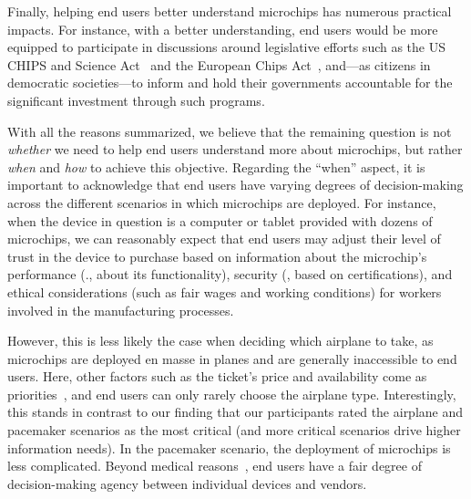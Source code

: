Finally, helping end users better understand microchips has numerous practical impacts. 
For instance, with a better understanding, end users would be more equipped to participate in discussions around legislative efforts such as the US CHIPS and Science Act~\cite{uschips2022} and the European Chips Act~\cite{euchips2022}, and---as citizens in democratic societies---to inform and hold their governments accountable for the significant investment through such programs. 



With all the reasons summarized, we believe that the remaining question is not \textit{whether} we need to help end users understand more about microchips, but rather \textit{when} and \textit{how} to achieve this objective. 
Regarding the \enquote{when} aspect, it is important to acknowledge that end users have varying degrees of decision-making across the different scenarios in which microchips are deployed. 
For instance, when the device in question is a computer or tablet provided with dozens of microchips, we can reasonably expect that end users may adjust their level of trust in the device to purchase based on information about the microchip's performance (\eg., about its functionality), security (\eg, based on certifications), and ethical considerations (such as fair wages and working conditions) for workers involved in the manufacturing processes. 

However, this is less likely the case when deciding which airplane to take, as microchips are deployed en masse in planes and are generally inaccessible to end users.
Here, other factors such as the ticket's price and availability come as priorities~\cite{anwar2021effect}, and end users can only rarely choose the airplane type. 
Interestingly, this stands in contrast to our finding that our participants rated the airplane and pacemaker scenarios as the most critical (and more critical scenarios drive higher information needs).
In the pacemaker scenario, the deployment of microchips is less complicated.
Beyond medical reasons~\cite{doi:10.1161/01.CIR.91.4.1063}, end users have a fair degree of decision-making agency between individual devices and vendors.


